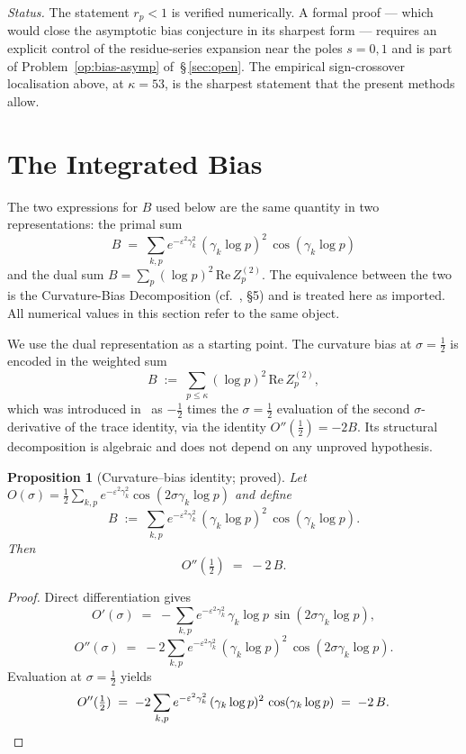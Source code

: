\documentclass[11pt]{article}
\newtheorem{proposition}[theorem]{Proposition}
\begin{document}
\emph{Status.}
The statement $r_p<1$ is verified numerically.
A formal proof --- which would close the asymptotic bias conjecture in
its sharpest form --- requires an explicit control of the
residue-series expansion near the poles $s=0,1$ and is part of
Problem~\ref{op:bias-asymp} of~\S\,\ref{sec:open}.
The empirical sign-crossover localisation above, at $\kappa=53$, is
the sharpest statement that the present methods allow.

\section{The Integrated Bias}
\label{sec:intbias}

The two expressions for $B$ used below are the same quantity in two
representations: the primal sum
\[
B \;=\; \sum_{k,p} e^{-\varepsilon^2\gamma_k^2}\,(\gamma_k\log p)^2\,
         \cos(\gamma_k\log p)
\]
and the dual sum $B=\sum_p(\log p)^2\,\mathrm{Re}\,Z_p^{(2)}$.
The equivalence between the two is the Curvature-Bias Decomposition
(cf.~\cite{Paper5}, \S5)
and is treated here as imported.
All numerical values in this section refer to the same object.

We use the dual representation as a starting point.
The curvature bias at $\sigma=\tfrac12$ is encoded in the weighted sum
\[
B \;:=\; \sum_{p\le\kappa}(\log p)^2\,\mathrm{Re}\,Z_p^{(2)},
\]
which was introduced in~\cite{Paper5} as $-\tfrac12$ times the
$\sigma=\tfrac12$ evaluation of the second $\sigma$-derivative of the
trace identity, via the identity $O''(\tfrac12)=-2B$.
Its structural decomposition is algebraic and does not depend on any
unproved hypothesis.

\begin{proposition}[Curvature--bias identity; proved]
\label{prop:curv-bias}
Let $O(\sigma)=\tfrac12\sum_{k,p} e^{-\varepsilon^2\gamma_k^2}
\cos(2\sigma\gamma_k\log p)$ and define
\[
B \;:=\; \sum_{k,p} e^{-\varepsilon^2\gamma_k^2}\,(\gamma_k\log p)^2\,
         \cos(\gamma_k\log p).
\]
Then
\[
O''(\tfrac12) \;=\; -2\,B.
\]
\end{proposition}

\begin{proof}
Direct differentiation gives
\[
O'(\sigma) \;=\; -\sum_{k,p} e^{-\varepsilon^2\gamma_k^2}\,\gamma_k\log p\,
                \sin(2\sigma\gamma_k\log p),
\]
\[
O''(\sigma) \;=\; -2\sum_{k,p} e^{-\varepsilon^2\gamma_k^2}\,
                (\gamma_k\log p)^2\,\cos(2\sigma\gamma_k\log p).
\]
Evaluation at $\sigma=\tfrac12$ yields
\[
O''(\tfrac12) \;=\; -2\sum_{k,p} e^{-\varepsilon^2\gamma_k^2}\,
                (\gamma_k\log p)^2\,\cos(\gamma_k\log p) \;=\; -2\,B.
\qedhere
\]
\end{proof}
\end{document}
